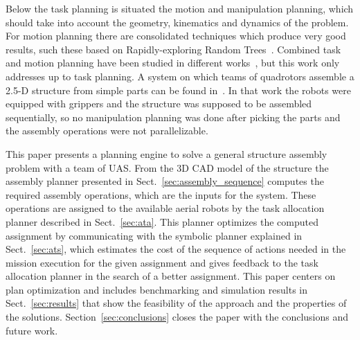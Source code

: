 \documentclass[letterpaper, 12pt, conference]{ieeeconf}    %
\begin{document}
Below the task planning is situated the motion and manipulation planning, which should take into account the geometry, kinematics and dynamics of the problem. For motion planning there are consolidated techniques which produce very good results, such these based on Rapidly-exploring Random Trees~\cite{LaValle04}. Combined task and motion planning have been studied in different works~\cite{Cambon01012009,Wolfe,Lagriffoul01122014}, but this work only addresses up to task planning. A system on which teams of quadrotors assemble a 2.5-D structure from simple parts can be found in~\cite{Lindsey-RSS-11}. In that work the robots were equipped with grippers and the structure was supposed to be assembled sequentially, so no manipulation planning was done after picking the parts and the assembly operations were not parallelizable.

This paper presents a planning engine to solve a general structure assembly problem with a team of UAS. From the 3D CAD model of the structure the assembly planner presented in Sect.~\ref{sec:assembly_sequence} computes the required assembly operations, which are the inputs for the system. These operations are assigned to the available aerial robots by the task allocation planner described in Sect.~\ref{sec:ata}. This planner optimizes the computed assignment by communicating with the symbolic planner explained in Sect.~\ref{sec:ats}, which estimates the cost of the sequence of actions needed in the mission execution for the given assignment and gives feedback to the task allocation planner in the search of a better assignment. This paper centers on plan optimization and includes benchmarking and simulation results in Sect.~\ref{sec:results} that show the feasibility of the approach and the properties of the solutions. Section~\ref{sec:conclusions} closes the paper with the conclusions and future work.
\end{document}
